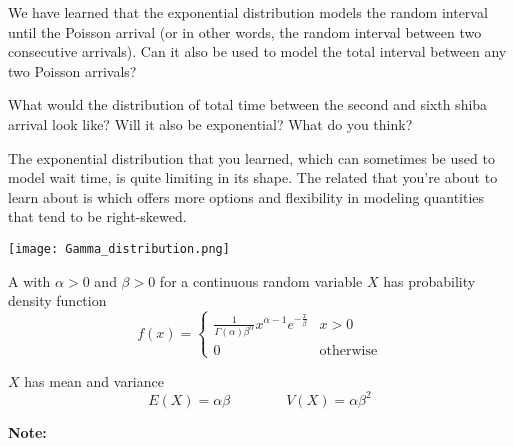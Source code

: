 We have learned that the exponential distribution models the random interval until the  Poisson arrival (or in other words, the random interval between two consecutive arrivals). Can it also be used to model the total interval between any two Poisson arrivals?

What would the distribution of total time between the second and sixth shiba arrival look like? Will it also be exponential? What do you think?


The exponential distribution that you learned, which can sometimes be used to model wait time, is quite limiting in its shape. The related  that you're about to learn about is  which offers more options and flexibility in modeling quantities that tend to be right-skewed. 

\begin{center} \texttt{[image: Gamma\_distribution.png]} \end{center}

\begin{definition}
    A  with  $\alpha > 0$ and  $\beta > 0$ for a continuous random variable $X$ has probability density function $$f(x) = \begin{cases} \frac{1}{\Gamma(\alpha)\beta^\alpha} x^{\alpha-1} e^{-\frac{x}{\beta}} & x > 0 \\ 0 & \text{otherwise} \end{cases}$$

    $X$ has mean and variance $$E(X) = \alpha\beta \qquad \qquad V(X) = \alpha\beta^2$$
\end{definition}

\textbf{Note:}

